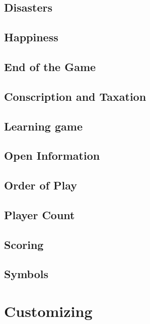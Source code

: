 \documentclass[12pt,a4paper,twocolumn,titlepage]{article}
\begin{document}
\subsection{Disasters}
\label{sec:disasters}


\subsection{Happiness}
\label{sec:happiness}


\subsection{End of the Game}
\label{sec:endgame}


\subsection{Conscription and Taxation}
\label{sec:anytime}


\subsection{Learning game}
\label{sec:learning}


\subsection{Open Information}
\label{sec:information}


\subsection{Order of Play}
\label{sec:order}


\subsection{Player Count}
\label{sec:playercount}


\subsection{Scoring}
\label{sec:scoring}


\subsection{Symbols}
\label{sec:symbols}

% 

\section{Customizing}
\label{sec:customizing}

\end{document}
